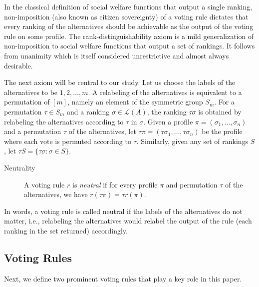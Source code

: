 \documentclass[prodmode,acmec]{ec-acmsmall}
\newcommand{\calL}{{\mathcal{L}}}
\newcommand{\rank}{{\calL(A)}}
\begin{document}
\noindent
In the classical definition of social welfare functions that output a single ranking, non-imposition (also known as citizen sovereignty) of a voting rule dictates that every ranking of the alternatives should be achievable as the output of the voting rule on some profile. The rank-distinguishability axiom is a mild generalization of non-imposition to social welfare functions that output a set of rankings. It follows from unanimity which is itself considered unrestrictive and almost always desirable.

The next axiom will be central to our study. Let us choose the labels of the alternatives to be $1,2,\ldots,m$. A relabeling of the alternatives is equivalent to a permutation of $[m]$, namely an element of the symmetric group $S_m$. For a permutation $\tau \in S_m$ and a ranking $\sigma \in \rank$, the ranking $\tau\sigma$ is obtained by relabeling the alternatives according to $\tau$ in $\sigma$. Given a profile $\pi = (\sigma_1,\ldots,\sigma_n)$ and a permutation $\tau$ of the alternatives, let $\tau \pi = (\tau \sigma_1,\ldots,\tau \sigma_n)$ be the profile where each vote is permuted according to $\tau$. Similarly, given any set of rankings $S$, let $\tau S = \{\tau \sigma : \sigma \in S\}$.
%
\begin{description}
\item[Neutrality] A voting rule $r$ is \emph{neutral} if for every profile $\pi$ and permutation $\tau$ of the alternatives, we have $r(\tau \pi) = \tau r(\pi)$.
\end{description}
%
In words, a voting rule is called neutral if the labels of the alternatives do not matter, i.e., relabeling the alternatives would relabel the output of the rule (each ranking in the set returned) accordingly.  

\subsection*{Voting Rules} Next, we define two prominent voting rules that play a key role in this paper.
\end{document}

